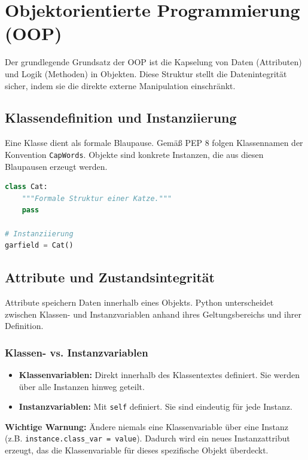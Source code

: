 \section{Objektorientierte Programmierung (OOP)}
\label{sec:oop}

Der grundlegende Grundsatz der OOP ist die Kapselung von Daten (Attributen) und Logik (Methoden) in Objekten. Diese Struktur stellt die Datenintegrität sicher, indem sie die direkte externe Manipulation einschränkt.

\subsection{Klassendefinition und Instanziierung}
Eine Klasse dient als formale Blaupause. Gemäß PEP 8 folgen Klassennamen der Konvention \texttt{CapWords}. Objekte sind konkrete Instanzen, die aus diesen Blaupausen erzeugt werden.

\begin{lstlisting}[language=Python]
class Cat:
    """Formale Struktur einer Katze."""
    pass

# Instanziierung
garfield = Cat()
\end{lstlisting}

\subsection{Attribute und Zustandsintegrität}
Attribute speichern Daten innerhalb eines Objekts. Python unterscheidet zwischen Klassen- und Instanzvariablen anhand ihres Geltungsbereichs und ihrer Definition.

\subsubsection{Klassen- vs. Instanzvariablen}
\begin{itemize}
    \item \textbf{Klassenvariablen:} Direkt innerhalb des Klassentextes definiert. Sie werden über alle Instanzen hinweg geteilt.
    \item \textbf{Instanzvariablen:} Mit \texttt{self} definiert. Sie sind eindeutig für jede Instanz.
\end{itemize}\vspace{1em}

\textbf{\color{red}Wichtige Warnung:} Ändere niemals eine Klassenvariable über eine Instanz 
(z.B. \texttt{instance.class\_var = value}). Dadurch wird ein neues Instanzattribut 
erzeugt, das die Klassenvariable für dieses spezifische Objekt überdeckt.

